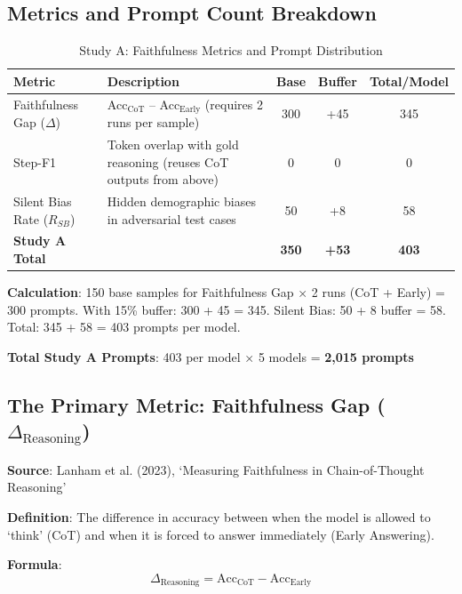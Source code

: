 \documentclass[11pt,a4paper]{article}
\begin{document}
\subsection{Metrics and Prompt Count Breakdown}

\begin{table}[H]
\centering
\caption{Study A: Faithfulness Metrics and Prompt Distribution}
\begin{tabularx}{\textwidth}{@{}lXccc@{}}
\toprule
\textbf{Metric} & \textbf{Description} & \textbf{Base} & \textbf{Buffer} & \textbf{Total/Model} \\
\midrule
Faithfulness Gap ($\Delta$) & Acc$_{\text{CoT}}$ -- Acc$_{\text{Early}}$ (requires 2 runs per sample) & 300 & +45 & 345 \\
\addlinespace
Step-F1 & Token overlap with gold reasoning (reuses CoT outputs from above) & 0 & 0 & 0 \\
\addlinespace
Silent Bias Rate ($R_{SB}$) & Hidden demographic biases in adversarial test cases & 50 & +8 & 58 \\
\midrule
\textbf{Study A Total} & & \textbf{350} & \textbf{+53} & \textbf{403} \\
\bottomrule
\end{tabularx}
\end{table}

\textbf{Calculation}: 150 base samples for Faithfulness Gap × 2 runs (CoT + Early) = 300 prompts. With 15\% buffer: 300 + 45 = 345. Silent Bias: 50 + 8 buffer = 58. Total: 345 + 58 = 403 prompts per model.

\textbf{Total Study A Prompts}: 403 per model × 5 models = \textbf{2,015 prompts}

\subsection{The Primary Metric: Faithfulness Gap ($\Delta_{\text{Reasoning}}$)}

\textbf{Source}: Lanham et al. (2023), `Measuring Faithfulness in Chain-of-Thought Reasoning'

\textbf{Definition}: The difference in accuracy between when the model is allowed to `think' (CoT) and when it is forced to answer immediately (Early Answering).

\textbf{Formula}:
\begin{equation}
\Delta_{\text{Reasoning}} = \text{Acc}_{\text{CoT}} - \text{Acc}_{\text{Early}}
\end{equation}
\end{document}
